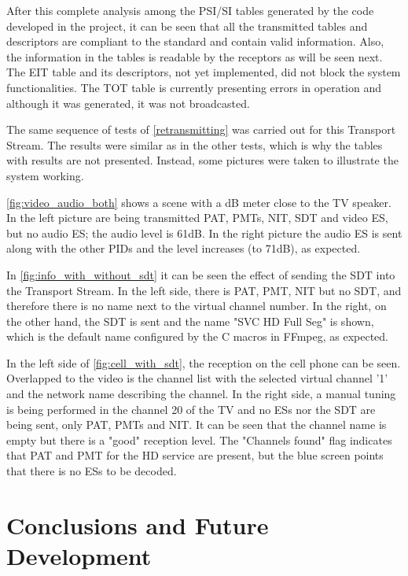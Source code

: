 \documentclass[12pt,a4paper]{article}
\begin{document}
After this complete analysis among the PSI/SI tables generated by the code developed in the project, it can be seen that all the transmitted tables and descriptors are compliant to the standard and contain valid information. Also, the information in the tables is readable by the receptors as will be seen next. The EIT table and its descriptors, not yet implemented, did not block the system functionalities. The TOT table is currently presenting errors in operation and although it was generated, it was not broadcasted.

The same sequence of tests of \autoref{retransmitting} was carried out for this Transport Stream. The results were similar as in the other tests, which is why the tables with results are not presented. Instead, some pictures were taken to illustrate the system working.

\autoref{fig:video_audio_both} shows a scene with a dB meter close to the TV speaker. In the left picture are being transmitted PAT, PMTs, NIT, SDT and video ES, but no audio ES; the audio level is 61dB. In the right picture the audio ES is sent along with the other PIDs and the level increases (to 71dB), as expected.

In \autoref{fig:info_with_without_sdt} it can be seen the effect of sending the SDT into the Transport Stream. In the left side, there is PAT, PMT, NIT but no SDT, and therefore there is no name next to the virtual channel number. In the right, on the other hand, the SDT is sent and the name "SVC HD Full Seg" is shown, which is the default name configured by the C macros in FFmpeg, as expected.

In the left side of \autoref{fig:cell_with_sdt}, the reception on the cell phone can be seen. Overlapped to the video is the channel list with the selected virtual channel '1' and the network name describing the channel. In the right side, a manual tuning is being performed in the channel 20 of the TV and no ESs nor the SDT are being sent, only PAT, PMTs and NIT. It can be seen that the channel name is empty but there is a "good" reception level. The "Channels found" flag indicates that PAT and PMT for the HD service are present, but the blue screen points that there is no ESs to be decoded.

\section[Conclusions and Future Development]{Conclusions and Future Development}
\end{document}
